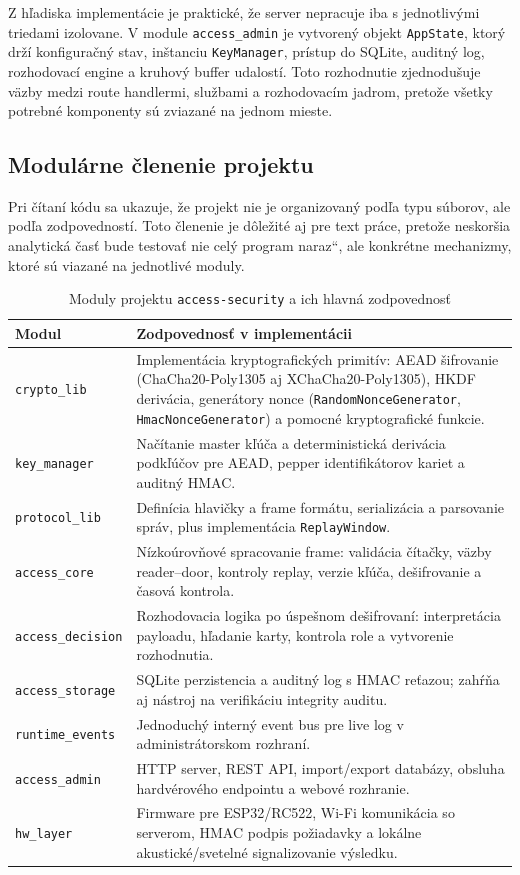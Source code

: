 \documentclass[journal,a4paper,onecolumn]{IEEEtran}
\newcommand{\uv}[1]{\quotedblbase#1\textquotedblleft}
\begin{document}
Z hľadiska implementácie je praktické, že server nepracuje iba s jednotlivými triedami izolovane. V module \texttt{access\_admin} je vytvorený objekt \texttt{AppState}, ktorý drží konfiguračný stav, inštanciu \texttt{KeyManager}, prístup do SQLite, auditný log, rozhodovací engine a kruhový buffer udalostí. Toto rozhodnutie zjednodušuje väzby medzi route handlermi, službami a rozhodovacím jadrom, pretože všetky potrebné komponenty sú zviazané na jednom mieste.

\subsection{Modulárne členenie projektu}

Pri čítaní kódu sa ukazuje, že projekt nie je organizovaný podľa typu súborov, ale podľa zodpovedností. Toto členenie je dôležité aj pre text práce, pretože neskoršia analytická časť bude testovať nie \uv{celý program naraz}, ale konkrétne mechanizmy, ktoré sú viazané na jednotlivé moduly.

\begin{table}[h]
\renewcommand{\arraystretch}{1.3}
\centering
\caption{Moduly projektu \texttt{access-security} a ich hlavná zodpovednosť}
\begin{tabular}{|p{3.2cm}|p{8.8cm}|}
\hline
\textbf{Modul} & \textbf{Zodpovednosť v implementácii} \\
\hline
\texttt{crypto\_lib} & Implementácia kryptografických primitív: AEAD šifrovanie (ChaCha20-Poly1305 aj XChaCha20-Poly1305), HKDF derivácia, generátory nonce (\texttt{RandomNonceGenerator}, \texttt{HmacNonceGenerator}) a pomocné kryptografické funkcie. \\
\hline
\texttt{key\_manager} & Načítanie master kľúča a deterministická derivácia podkľúčov pre AEAD, pepper identifikátorov kariet a auditný HMAC. \\
\hline
\texttt{protocol\_lib} & Definícia hlavičky a frame formátu, serializácia a parsovanie správ, plus implementácia \texttt{ReplayWindow}. \\
\hline
\texttt{access\_core} & Nízkoúrovňové spracovanie frame: validácia čítačky, väzby reader--door, kontroly replay, verzie kľúča, dešifrovanie a časová kontrola. \\
\hline
\texttt{access\_decision} & Rozhodovacia logika po úspešnom dešifrovaní: interpretácia payloadu, hľadanie karty, kontrola role a vytvorenie rozhodnutia. \\
\hline
\texttt{access\_storage} & SQLite perzistencia a auditný log s HMAC reťazou; zahŕňa aj nástroj na verifikáciu integrity auditu. \\
\hline
\texttt{runtime\_events} & Jednoduchý interný event bus pre live log v administrátorskom rozhraní. \\
\hline
\texttt{access\_admin} & HTTP server, REST API, import/export databázy, obsluha hardvérového endpointu a webové rozhranie. \\
\hline
\texttt{hw\_layer} & Firmware pre ESP32/RC522, Wi-Fi komunikácia so serverom, HMAC podpis požiadavky a lokálne akustické/svetelné signalizovanie výsledku. \\
\hline
\end{tabular}
\end{table}
\end{document}
